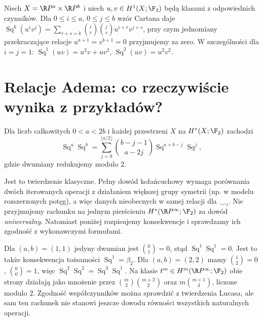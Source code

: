 \begin{przyklad}
Niech $X=\R P^{a}\times\R P^{b}$ i niech
$u,v\in H^1(X;\F_2)$ będą klasami z odpowiednich czynników.
Dla $0\le i\le a$, $0\le j\le b$ wzór Cartana daje
$\operatorname{Sq}^{k}(u^iv^j)=
\sum_{r+s=k}\binom ir\binom js u^{i+r}v^{j+s}$,
przy czym jednomiany przekraczające relacje
$u^{a+1}=v^{b+1}=0$ przyjmujemy za zero.
W szczególności dla $i=j=1$:
$\operatorname{Sq}^1(uv)=u^2v+uv^2$,
$\operatorname{Sq}^2(uv)=u^2v^2$.
\end{przyklad}

\section{Relacje Adema: co rzeczywiście wynika z przykładów?}
\begin{twierdzenie}
\label{thm:adem-v8}
Dla liczb całkowitych $0<a<2b$ i każdej przestrzeni $X$
na $H^*(X;\F_2)$ zachodzi
\[
\operatorname{Sq}^a\operatorname{Sq}^b
 =\sum_{j=0}^{\lfloor a/2\rfloor}
 \binom{b-j-1}{a-2j}
 \operatorname{Sq}^{a+b-j}\operatorname{Sq}^{j},
\]
gdzie dwumiany redukujemy modulo $2$.
\end{twierdzenie}
\begin{uwaga}
Jest to twierdzenie klasyczne. Pełny dowód kołańcuchowy
wymaga porównania dwóch iterowanych operacji z działaniem
większej grupy symetrii (np. w modelu rozszerzonych potęg),
a więc danych nieobecnych w samej relacji dla $\smile_i$.
Nie przyjmujemy rachunku na jednym pierścieniu
$H^*(\R P^\infty;\F_2)$ za dowód \emph{uniwersalny}.
Natomiast poniżej rozpisujemy konsekwencje i sprawdzamy ich
zgodność z wykonawczymi formułami.
\end{uwaga}
\begin{przyklad}
Dla $(a,b)=(1,1)$ jedyny dwumian jest
$\binom{0}{1}=0$, stąd
$\operatorname{Sq}^1\operatorname{Sq}^1=0$.
Jest to także konsekwencja tożsamości
$\operatorname{Sq}^1=\beta_2$.
Dla $(a,b)=(2,2)$ mamy
$\binom{1}{2}=0$, $\binom{0}{0}=1$, więc
$\operatorname{Sq}^2\operatorname{Sq}^2=
\operatorname{Sq}^3\operatorname{Sq}^1$.
Na klasie $t^m\in H^m(\R P^\infty;\F_2)$
obie strony działają jako mnożenie przez
$\binom m2\binom{m+2}2$ oraz
$m\binom{m+1}3$, liczone modulo $2$.
Zgodność współczynników można sprawdzić z twierdzenia Lucasa,
ale sam ten rachunek nie stanowi jeszcze dowodu
równości wszystkich naturalnych operacji.
\end{przyklad}

